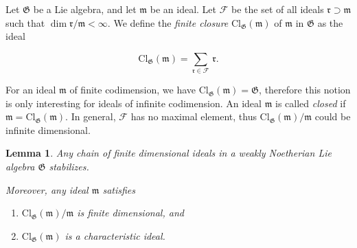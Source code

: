 \documentclass[11pt, letterpaper, reqno]{amsart}
\newtheorem{lemma}[theorem]{Lemma}
\theoremstyle{definition}
\newcommand{\cF}{\mathcal F}
\newcommand{\fm}{\mathfrak{m}}
\newcommand{\fr}{\mathfrak{r}}
\newcommand{\fG}{\mathfrak{G}}
\newcommand{\Cl}{\mathrm{Cl}}
\begin{document}
Let  $\fG$ be a Lie algebra, and let $\fm$ be an ideal. Let $\cF$ be the set of all
ideals $\fr\supset\fm$ such that 
$\dim\fr/\fm<\infty$.
We define the {\it finite closure} 
$\Cl_{\fG}(\fm)$ of $\fm$
in $\fG$ as the ideal

$$\Cl_{\fG}(\fm)=\sum_{\fr\in\cF}\,\fr.$$

\noindent For an ideal $\fm$ of finite codimension, we have $\Cl_{\fG}(\fm)=\fG$,
therefore this notion 
is only interesting for ideals
of infinite codimension.
An ideal $\fm$  is called 
{\it closed} if $\fm=\Cl_{\fG}(\fm)$.
In general, $\cF$ has no maximal 
element, thus  $\Cl_{\fG}(\fm)/\fm$ could be infinite dimensional. 





\begin{lemma}\label{closure} 
Any chain of finite dimensional ideals 
in  a weakly Noetherian Lie algebra $\fG$ stabilizes.


Moreover,  any ideal $\fm$ satisfies

\begin{enumerate}
\item[(a)] $\Cl_{\fG}(\fm)/\fm$ is finite 
dimensional, and
\item[(b)] $\Cl_{\fG}(\fm)$ is a characteristic ideal.
\end{enumerate}
\end{lemma}
\end{document}
